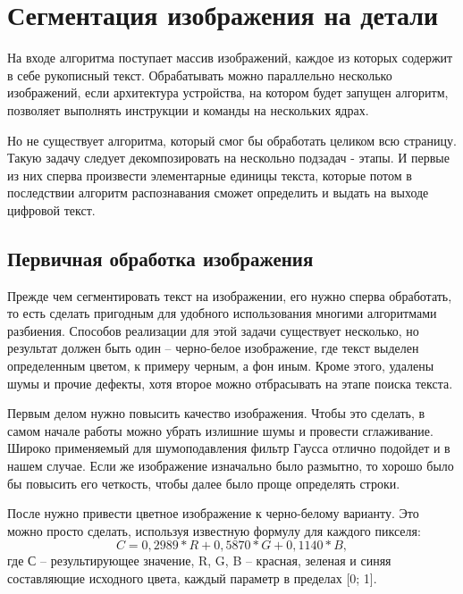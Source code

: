 \chapter{Сегментация изображения на детали} %
	

На входе алгоритма поступает массив изображений, каждое из которых содержит в себе рукописный текст. Обрабатывать можно параллельно несколько изображений, если архитектура устройства, на котором будет запущен алгоритм, позволяет выполнять инструкции и команды на нескольких ядрах.

Но не существует алгоритма, который смог бы обработать целиком всю страницу. Такую задачу следует декомпозировать на нескольно подзадач - этапы. И первые из них сперва произвести элементарные единицы текста, которые потом в последствии алгоритм распознавания сможет определить и выдать на выходе цифровой текст.

\section{Первичная обработка изображения}

Прежде чем сегментировать текст на изображении, его нужно сперва обработать, то есть сделать пригодным для удобного использования многими алгоритмами разбиения. Способов реализации для этой задачи существует несколько, но результат должен быть один – черно-белое изображение, где текст выделен определенным цветом, к примеру черным, а фон иным. Кроме этого, удалены шумы и прочие дефекты, хотя второе можно отбрасывать на этапе поиска текста.

Первым делом нужно повысить качество изображения. Чтобы это сделать, в самом начале работы можно убрать излишние шумы и провести сглаживание. Широко применяемый для шумоподавления фильтр Гаусса отлично подойдет и в нашем случае. Если же изображение изначально было размытно, то хорошо было бы повысить его четкость, чтобы далее было проще определять строки.

После нужно привести цветное изображение к черно-белому варианту. Это можно просто сделать, используя известную формулу для каждого пикселя: 
\begin{equation}%
	\label{eq:Pixel-ch1} %
	C = 0,2989 * R + 0,5870 * G + 0,1140 * B,
\end{equation}
где С – результирующее значение, R, G, B – красная, зеленая и синяя составляющие исходного цвета, каждый параметр в пределах [0; 1]. 

